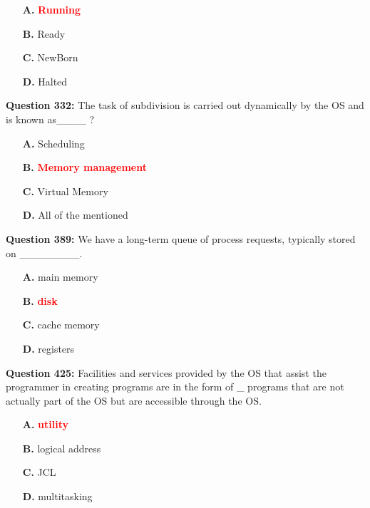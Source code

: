 \documentclass[12pt,a4paper]{article}
\begin{document}
\begin{itemize}
    \item[\textbf{A.}] \textcolor{red}{\textbf{Running}}
    \item[\textbf{B.}] Ready
    \item[\textbf{C.}] NewBorn
    \item[\textbf{D.}] Halted
\end{itemize}

\vspace{0.5cm}

\textbf{Question 332:} The task of subdivision is carried out dynamically by the OS and is known as____ ?

\begin{itemize}
    \item[\textbf{A.}] Scheduling
    \item[\textbf{B.}] \textcolor{red}{\textbf{Memory management}}
    \item[\textbf{C.}] Virtual Memory
    \item[\textbf{D.}] All of the mentioned
\end{itemize}

\vspace{0.5cm}

\textbf{Question 389:} We have a long-term queue of process requests, typically stored on ________.

\begin{itemize}
    \item[\textbf{A.}] main memory
    \item[\textbf{B.}] \textcolor{red}{\textbf{disk}}
    \item[\textbf{C.}] cache memory
    \item[\textbf{D.}] registers
\end{itemize}

\vspace{0.5cm}

\textbf{Question 425:} Facilities and services provided by the OS that assist the programmer in creating programs are in the form of _ programs that are not actually part of the OS but are accessible through the OS.

\begin{itemize}
    \item[\textbf{A.}] \textcolor{red}{\textbf{utility}}
    \item[\textbf{B.}] logical address
    \item[\textbf{C.}] JCL
    \item[\textbf{D.}] multitasking
\end{itemize}
\end{document}

